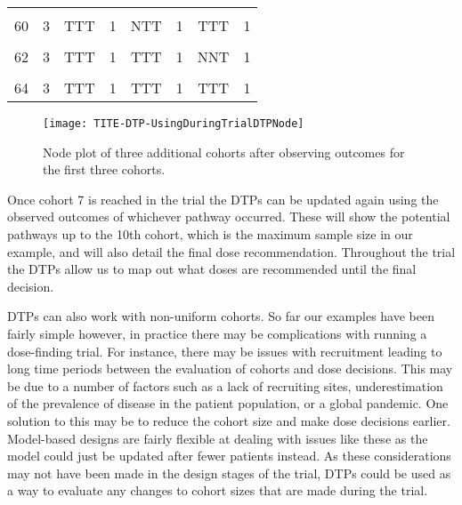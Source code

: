 \begin{table}[H]
{\begin{tabular}[t]{cccccccc}
			\cellcolor{gray!6}{59} & \cellcolor{gray!6}{3} & \cellcolor{gray!6}{TTT} & \cellcolor{gray!6}{1} & \cellcolor{gray!6}{NTT} & \cellcolor{gray!6}{1} & \cellcolor{gray!6}{NTT} & \cellcolor{gray!6}{1}\\
			60 & 3 & TTT & 1 & NTT & 1 & TTT & 1\\
			\cellcolor{gray!6}{61} & \cellcolor{gray!6}{3} & \cellcolor{gray!6}{TTT} & \cellcolor{gray!6}{1} & \cellcolor{gray!6}{TTT} & \cellcolor{gray!6}{1} & \cellcolor{gray!6}{NNN} & \cellcolor{gray!6}{1}\\
			62 & 3 & TTT & 1 & TTT & 1 & NNT & 1\\
			\cellcolor{gray!6}{63} & \cellcolor{gray!6}{3} & \cellcolor{gray!6}{TTT} & \cellcolor{gray!6}{1} & \cellcolor{gray!6}{TTT} & \cellcolor{gray!6}{1} & \cellcolor{gray!6}{NTT} & \cellcolor{gray!6}{1}\\
			64 & 3 & TTT & 1 & TTT & 1 & TTT & 1\\
			\bottomrule
	\end{tabular}}
\end{table}

\begin{figure}[h!]
	\centering
	\caption[DTP node plot for three additional cohorts.]{Node plot of three additional cohorts after observing outcomes for the first three cohorts.}
	\label{fig_tite-dtp:UsingDuringTrialDTPNode4-7}
	\texttt{[image: TITE-DTP-UsingDuringTrialDTPNode]}
\end{figure}

Once cohort 7 is reached in the trial the DTPs can be updated again using the observed outcomes of whichever pathway occurred. These will show the potential pathways up to the 10th cohort, which is the maximum sample size in our example, and will also detail the final dose recommendation. Throughout the trial the DTPs allow us to map out what doses are recommended until the final decision. 

DTPs can also work with non-uniform cohorts. So far our examples have been fairly simple however, in practice there may be complications with running a dose-finding trial. For instance, there may be issues with recruitment leading to long time periods between the evaluation of cohorts and dose decisions. This may be due to a number of factors such as a lack of recruiting sites, underestimation of the prevalence of disease in the patient population, or a global pandemic. One solution to this may be to reduce the cohort size and make dose decisions earlier. Model-based designs are fairly flexible at dealing with issues like these as the model could just be updated after fewer patients instead. As these considerations may not have been made in the design stages of the trial, DTPs could be used as a way to evaluate any changes to cohort sizes that are made during the trial. 

